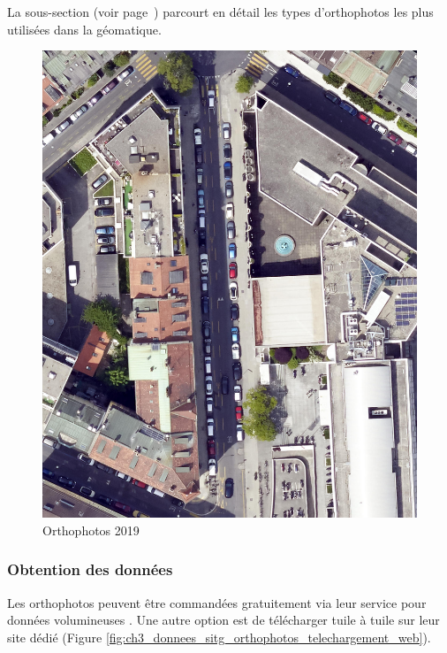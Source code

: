 La sous-section \textit{} (voir page~\pageref{subsec:annexe_ortophotos}) parcourt en détail les types d'orthophotos les plus utilisées dans la géomatique.

\begin{figure}[H]
    \centering
    \includegraphics[width=1\linewidth]{02-main//figures/ch3/ch3_dataset_methodo_01_orthophoto_2019.png}
    \caption{Orthophotos 2019}
    \label{fig:ch3_dataset_methodo_01_orthophoto_2019}
\end{figure}

\subsubsection{Obtention des données}
Les orthophotos peuvent être commandées gratuitement via leur service pour données volumineuses \cite{sitg_commande_nodate}. Une autre option est de télécharger tuile à tuile sur leur site dédié (Figure \ref{fig:ch3_donnees_sitg_orthophotos_telechargement_web}).

